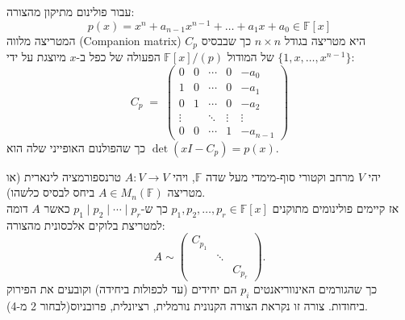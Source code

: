 \documentclass{tstextbook}
\begin{document}
\begin{definition}
עבור פולינום מתיקון מהצורה:
$$p(x) = x^n + a_{n-1} x^{n-1} + \dots + a_1 x + a_0 \in \mathbb{F}[x]$$
המטריצה מלווה (Companion matrix) \(C_p\) היא מטריצה בגודל \(n\times n\) כך שבבסיס \(\{1,x,\dots,x^{n-1}\}\) של המודול \(\mathbb{F}[x]/(p)\) הפעולה של כפל ב-\(x\) מיוצגת על ידי:\\
$$  C_p \;=\;  \begin{pmatrix}  0 & 0 & \cdots & 0 & -a_0 \\  1 & 0 & \cdots & 0 & -a_1 \\  0 & 1 & \cdots & 0 & -a_2 \\  \vdots & & \ddots & \vdots & \vdots \\  0 & 0 & \cdots & 1 & -a_{n-1}  \end{pmatrix}
  $$
  כך שהפולנום האופייני שלה הוא \(\det(xI - C_p) = p(x)\).

\end{definition}
\begin{theorem}[פורובניוס]
יהי \(V\) מרחב וקטורי סוף-מימדי מעל שדה \(\mathbb{F}\), ויהי \(A:V \to V\) טרנספורמציה לינארית (או מטריצה \(A \in M_n(\mathbb{F})\) ביחס לבסיס כלשהו).\\

אז קיימים פולינומים מתוקנים \(p_1, p_2, \dots, p_r \in \mathbb{F}[x]\) כך ש-\(p_1 \mid p_2 \mid \cdots \mid p_r\) כאשר \(A\) דומה למטריצת בלוקים אלכסונית מהצורה:
$$A \sim \begin{pmatrix}C_{p_1} & & \\& \ddots & \\& & C_{p_r}\end{pmatrix}.
$$
כך שהגורמים האינווריאנטים \(p_{i}\) הם יחידים (עד לכפולות ביחידה) וקובעים את הפירוק ביחודות.
צורה זו נקראת הצורה הקנונית נורמלית, רציונלית, פרובניוס(לבחור 2 מ-4).

\end{theorem}
\end{document}
